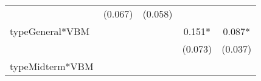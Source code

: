 \documentclass[12pt,twoside]{reedthesis}
\begin{document}
\begin{longtable}[]{@{}lcccc@{}}
\begin{minipage}[t]{0.13\columnwidth}
  \strut
  \end{minipage} & \begin{minipage}[t]{0.14\columnwidth}\centering\strut
  (0.067)\strut
  \end{minipage} & \begin{minipage}[t]{0.14\columnwidth}\centering\strut
  (0.058)\strut
  \end{minipage}\tabularnewline
  \begin{minipage}[t]{0.26\columnwidth}\raggedright\strut
  typeGeneral*VBM\strut
  \end{minipage} & \begin{minipage}[t]{0.12\columnwidth}\centering\strut
  \strut
  \end{minipage} & \begin{minipage}[t]{0.13\columnwidth}\centering\strut
  \strut
  \end{minipage} & \begin{minipage}[t]{0.14\columnwidth}\centering\strut
  0.151*\strut
  \end{minipage} & \begin{minipage}[t]{0.14\columnwidth}\centering\strut
  0.087*\strut
  \end{minipage}\tabularnewline
  \begin{minipage}[t]{0.26\columnwidth}\raggedright\strut
  \strut
  \end{minipage} & \begin{minipage}[t]{0.12\columnwidth}\centering\strut
  \strut
  \end{minipage} & \begin{minipage}[t]{0.13\columnwidth}\centering\strut
  \strut
  \end{minipage} & \begin{minipage}[t]{0.14\columnwidth}\centering\strut
  (0.073)\strut
  \end{minipage} & \begin{minipage}[t]{0.14\columnwidth}\centering\strut
  (0.037)\strut
  \end{minipage}\tabularnewline
  \begin{minipage}[t]{0.26\columnwidth}\raggedright\strut
  typeMidterm*VBM\strut
  \end{minipage} & \begin{minipage}[t]{0.12\columnwidth}\centering\strut
  \strut
  \end{minipage} & \begin{minipage}[t]{0.13\columnwidth}\centering\strut
  \strut
  \end{minipage} & \begin{minipage}[t]{0.14\columnwidth}\centering\strut

\end{minipage}
\end{longtable}
\end{document}
